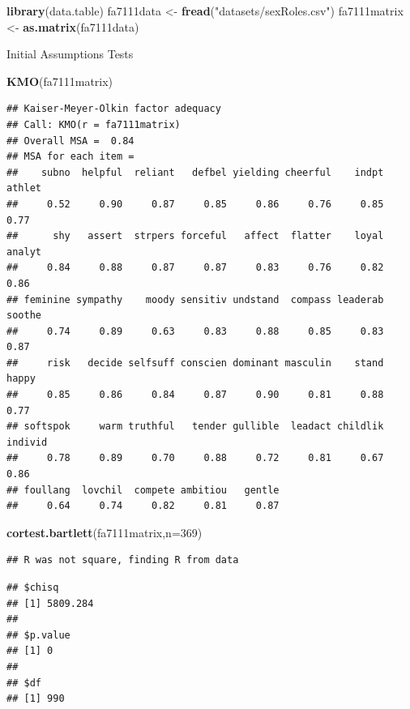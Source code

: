 \documentclass[]{book}
\newenvironment{Shaded}{\begin{snugshade}}{\end{snugshade}}
\newcommand{\KeywordTok}[1]{\textcolor[rgb]{0.13,0.29,0.53}{\textbf{#1}}}
\newcommand{\DataTypeTok}[1]{\textcolor[rgb]{0.13,0.29,0.53}{#1}}
\newcommand{\DecValTok}[1]{\textcolor[rgb]{0.00,0.00,0.81}{#1}}
\newcommand{\StringTok}[1]{\textcolor[rgb]{0.31,0.60,0.02}{#1}}
\newcommand{\NormalTok}[1]{#1}
\theoremstyle{definition}
\theoremstyle{definition}
\theoremstyle{definition}
\theoremstyle{remark}
\begin{document}
\begin{Shaded}
\begin{Highlighting}[]
\KeywordTok{library}\NormalTok{(data.table)}
\NormalTok{fa7111data <-}\StringTok{ }\KeywordTok{fread}\NormalTok{(}\StringTok{"datasets/sexRoles.csv"}\NormalTok{)}
\NormalTok{fa7111matrix <-}\StringTok{ }\KeywordTok{as.matrix}\NormalTok{(fa7111data)}
\end{Highlighting}
\end{Shaded}

Initial Assumptions Tests

\begin{Shaded}
\begin{Highlighting}[]
\KeywordTok{KMO}\NormalTok{(fa7111matrix)}
\end{Highlighting}
\end{Shaded}

\begin{verbatim}
## Kaiser-Meyer-Olkin factor adequacy
## Call: KMO(r = fa7111matrix)
## Overall MSA =  0.84
## MSA for each item = 
##    subno  helpful  reliant   defbel yielding cheerful    indpt   athlet 
##     0.52     0.90     0.87     0.85     0.86     0.76     0.85     0.77 
##      shy   assert  strpers forceful   affect  flatter    loyal   analyt 
##     0.84     0.88     0.87     0.87     0.83     0.76     0.82     0.86 
## feminine sympathy    moody sensitiv undstand  compass leaderab   soothe 
##     0.74     0.89     0.63     0.83     0.88     0.85     0.83     0.87 
##     risk   decide selfsuff conscien dominant masculin    stand    happy 
##     0.85     0.86     0.84     0.87     0.90     0.81     0.88     0.77 
## softspok     warm truthful   tender gullible  leadact childlik  individ 
##     0.78     0.89     0.70     0.88     0.72     0.81     0.67     0.86 
## foullang  lovchil  compete ambitiou   gentle 
##     0.64     0.74     0.82     0.81     0.87
\end{verbatim}

\begin{Shaded}
\begin{Highlighting}[]
\KeywordTok{cortest.bartlett}\NormalTok{(fa7111matrix,}\DataTypeTok{n=}\DecValTok{369}\NormalTok{)}
\end{Highlighting}
\end{Shaded}

\begin{verbatim}
## R was not square, finding R from data
\end{verbatim}

\begin{verbatim}
## $chisq
## [1] 5809.284
## 
## $p.value
## [1] 0
## 
## $df
## [1] 990
\end{verbatim}
\end{document}
